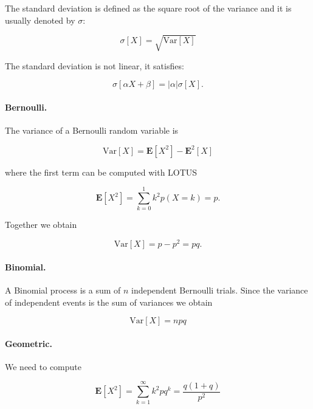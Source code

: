 \documentclass[12pt]{article}
\begin{document}
The standard deviation is defined as the square root of the variance and it is usually denoted by $\sigma$:

\begin{equation}
\sigma [ X ] = \sqrt{ \mbox{Var} [ X ]  }
\end{equation}

\noindent
The standard deviation is not linear, it satisfies:

\begin{equation}
\sigma [ \alpha X + \beta ] = | \alpha | \sigma [ X ] .
\end{equation}

\paragraph{Bernoulli.}
The variance of a Bernoulli random variable is

\begin{equation}
\mbox{Var} [ X ] =  \mathbf{E} [ X^{2} ]  - \mathbf{E}^{2} [ X ]
\end{equation}

\noindent
where the first term can be computed with LOTUS

\begin{equation}
\mathbf{E} [ X^{2} ] = \sum_{k = 0}^{1} k^{2} p( X = k) = p.
\end{equation}

\noindent
Together we obtain

\begin{equation}
\mbox{Var} [ X ] = p - p^{2} = p q .
\end{equation}

\paragraph{Binomial.}
A Binomial process is a sum of $n$ independent Bernoulli trials.
Since the variance of independent events is the sum of variances
we obtain

\begin{equation}
\mbox{Var} [ X ] = n p q
\end{equation}

\paragraph{Geometric.}
We need to compute

\begin{equation}
\mathbf{E} [ X^{2} ]  =
\sum_{k = 1}^{\infty} k^{2} p q^{k} = \frac{q (1 + q)}{p^{2}}
\end{equation}
\end{document}
